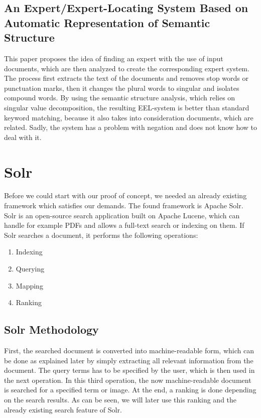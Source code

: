 \documentclass[a4paper,12pt]{article}
\begin{document}
\subsection{An Expert/Expert-Locating System Based on Automatic Representation of Semantic Structure}
This paper \cite{EEL} proposes the idea of finding an expert with the use of input documents, which are then analyzed to create the corresponding expert system. 
The process first extracts the text of the documents and removes stop words or punctuation marks, then it changes the plural words to singular and isolates compound words. 
By using the semantic structure analysis, which relies on singular value decomposition, the resulting EEL-system is better than standard keyword matching, because it also takes into consideration documents, which are related. 
Sadly, the system has a problem with negation and does not know how to deal with it.


\section{Solr}
Before we could start with our proof of concept, we needed an already existing framework which satisfies our demands.
The found framework is Apache Solr\cite{Solr}.
Solr\cite{Solr} is an open-source search application built on Apache Lucene, which can handle for example PDFs and allows a full-text search or indexing on them. 
If Solr searches a document, it performs the following operations:

\begin{enumerate}
    \item Indexing 
    \item Querying
    \item Mapping
    \item Ranking
\end{enumerate}

\subsection{Solr Methodology} %
First, the searched document is converted into machine-readable form, which can be done as explained later by simply extracting all relevant information from the document. 
The query terms has to be specified by the user, which is then used in the next operation. 
In this third operation, the now machine-readable document is searched for a specified term or image. 
At the end, a ranking is done depending on the search results. As can be seen, we will later use this ranking and the already existing search feature of Solr.
\end{document}
